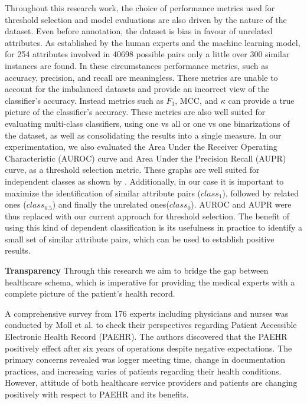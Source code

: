 \documentclass{ieeeaccess}
\begin{document}
Throughout this research work, the choice of performance metrics used for threshold selection and model evaluations are also driven by the nature of the dataset. Even before annotation, the dataset is bias in favour of unrelated attributes. As established by the human experts and the machine learning model, for 254 attributes involved in 40698 possible pairs only a little over 300 similar instances are found. In these circumstances performance metrics, such as accuracy, precision, and recall are meaningless. These metrics are unable to account for the imbalanced datasets and provide an incorrect view of the classifier's accuracy. Instead metrics such as $F_1$, MCC, and $\kappa$ can provide a true picture of the classifier's accuracy. These metrics are also well suited for evaluating multi-class classifiers, using one vs all or one vs one binarizations of the dataset, as well as consolidating the results into a single measure. In our experimentation, we also evaluated the Area Under the Receiver Operating Characteristic (AUROC) curve and Area Under the Precision Recall (AUPR) curve, as a threshold selection metric. These graphs are well suited for independent classes as shown by \cite{espindola2005extending}. Additionally, in our case it is important to maximize the identification of similar attribute pairs ($class_1$), followed by related ones ($class_{0.5}$) and finally the unrelated ones($class_0$). AUROC and AUPR were thus replaced with our current approach for threshold selection. The benefit of using this kind of dependent classification is its usefulness in practice to identify a small set of similar attribute pairs, which can be used to establish positive results.

\textbf{Transparency}
Through this research we aim to bridge the gap between healthcare schema, which is imperative for providing the medical experts with a complete picture of the patient's health record.

A comprehensive survey from 176 experts including physicians and nurses was conducted by Moll et al. \cite{moll2020oncology} to check their perspectives regarding Patient Accessible Electronic Health Record (PAEHR). The authors discovered that the PAEHR positively effect after six years of operations despite negative expectations. The primary concerns revealed was logger meeting time, change in documentation practices, and increasing varies of patients regarding their health conditions. However, attitude of both healthcare service providers and patients are changing positively with respect to PAEHR and its benefits. 
\end{document}

